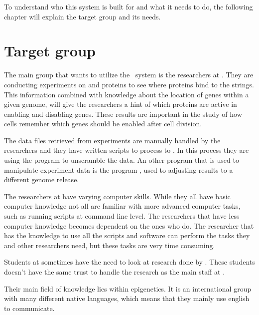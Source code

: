 To understand who this system is built for and what it needs to do, the following chapter will explain the target group and its needs.

\section{Target group}

The main group that wants to utilize the \appName\ system is the researchers at . They are conducting experiments on  and proteins to see where proteins bind to the  strings. This information combined with knowledge about the location of genes within a given genome, will give the researchers a hint of which proteins are active in enabling and disabling genes. These results are important in the study of how cells remember which genes should be enabled after cell division.

The data files retrieved from experiments are manually handled by the researchers and they have written scripts to process  to . In this process they are using the program  to unscramble the  data. An other program that is used to manipulate experiment data is the program , used to adjusting results to a different genome release.

The researchers at  have varying computer skills. While they all have basic computer knowledge not all are familiar with more advanced computer tasks, such as running scripts at command line level. The researchers that have less computer knowledge becomes dependent on the ones who do. The researcher that has the knowledge to use all the scripts and software can perform the tasks they and other researchers need, but these tasks are very time consuming.

Students at  sometimes have the need to look at research done by . These students doesn't have the same trust to handle the research as the main staff at .

Their main field of knowledge lies within epigenetics. It is an international group with many different native languages, which means that they mainly use english to communicate.


